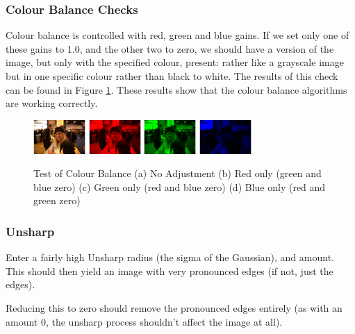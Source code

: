 \documentclass[10pt,a4paper]{article}
\begin{document}
\subsubsection{Colour Balance Checks}
Colour balance is controlled with red, green and blue gains. If we set only one of these gains to 1.0, and the other two to zero, we should
have a version of the image, but only with the specified colour, present: rather like a grayscale image but in one specific colour rather than black to white.
The results of this check can be found in Figure \ref{colourbalancetest}. These results show that the colour balance algorithms are working correctly.
\begin{figure}\label{colourbalancetest}
    \centering
    \subfigure
    {
        \includegraphics[width=75px]{colourtest_no_adjustment}
    }
    \subfigure
    {
        \includegraphics[width=75px]{colourtest_redonly}
    }
    \subfigure
    {
        \includegraphics[width=75px]{colourtest_greenonly}
    }
    \subfigure
    {
        \includegraphics[width=75px]{blueonly}
    }
    \caption{
        Test of Colour Balance 
        (a) No Adjustment
        (b) Red only (green and blue zero)
        (c) Green only (red and blue zero)
        (d) Blue only (red and green zero)
    }
 \end{figure}

\subsubsection{Unsharp}
Enter a fairly high Unsharp radius (the sigma of the Gaussian), and amount. This should then yield an image with very pronounced edges (if not, just the edges).

Reducing this to zero should remove the pronounced edges entirely (as with an amount 0, the unsharp process shouldn't affect the image at all).
\end{document}
